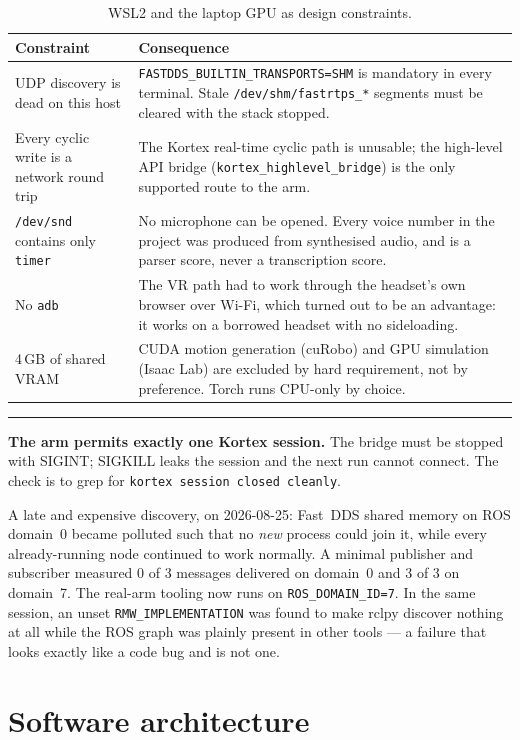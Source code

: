 \documentclass[11pt,a4paper,oneside]{report}
\newcommand{\code}[1]{\texttt{\small #1}}
\newcommand{\file}[1]{\texttt{\small #1}}
\newcommand{\keyfact}[1]{%
  \par\vspace{7pt}\noindent
  \hspace*{0pt}\textcolor{srlblue}{\rule{2.5pt}{\dimexpr\baselineskip\relax}}%
  \hspace{9pt}%
  \begin{minipage}[t]{\dimexpr\textwidth-14pt\relax}
  \small #1
  \end{minipage}\par\vspace{7pt}}
\begin{document}
\begin{table}[H]
\centering
\small
\begin{tabularx}{\textwidth}{@{}lX@{}}
\toprule
\textbf{Constraint} & \textbf{Consequence} \\
\midrule
UDP discovery is dead on this host &
\code{FASTDDS\_BUILTIN\_TRANSPORTS=SHM} is mandatory in every terminal. Stale
\file{/dev/shm/fastrtps\_*} segments must be cleared with the stack stopped. \\
Every cyclic write is a network round trip &
The Kortex real-time cyclic path is unusable; the high-level API bridge
(\code{kortex\_highlevel\_bridge}) is the only supported route to the arm. \\
\file{/dev/snd} contains only \code{timer} &
No microphone can be opened. Every voice number in the project was produced
from synthesised audio, and is a parser score, never a transcription score. \\
No \code{adb} &
The VR path had to work through the headset's own browser over Wi-Fi, which
turned out to be an advantage: it works on a borrowed headset with no
sideloading. \\
4\,GB of shared VRAM &
CUDA motion generation (cuRobo) and GPU simulation (Isaac Lab) are excluded by
hard requirement, not by preference. Torch runs CPU-only by choice. \\
\bottomrule
\end{tabularx}
\caption{WSL2 and the laptop GPU as design constraints.}
\end{table}

\keyfact{\textbf{The arm permits exactly one Kortex session.} The bridge must
be stopped with SIGINT; SIGKILL leaks the session and the next run cannot
connect. The check is to grep for \code{kortex session closed cleanly}.}

A late and expensive discovery, on 2026-08-25: Fast~DDS shared memory on ROS
domain~0 became polluted such that no \emph{new} process could join it, while
every already-running node continued to work normally. A minimal publisher and
subscriber measured 0 of 3 messages delivered on domain~0 and 3 of 3 on
domain~7. The real-arm tooling now runs on \code{ROS\_DOMAIN\_ID=7}. In the
same session, an unset \code{RMW\_IMPLEMENTATION} was found to make rclpy
discover nothing at all while the ROS graph was plainly present in other
tools --- a failure that looks exactly like a code bug and is not one.

\chapter{Software architecture}
\end{document}
